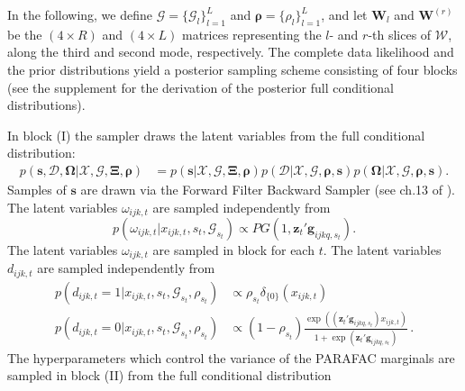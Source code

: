 \documentclass[12pt,a4paper]{article}
\theoremstyle{custom}
\begin{document}
In the following, we define $\mathcal{G} = \lbrace \mathcal{G}_l \rbrace_{l=1}^L$ and $\boldsymbol{\rho} = \lbrace \rho_l \rbrace_{l=1}^L$, and let $\mathbf{W}_l$ and $\mathbf{W}^{(r)}$ be the $(4\times R)$ and $(4\times L)$ matrices representing the $l$- and $r$-th slices of $\mathcal{W}$, along the third and second mode, respectively.
The complete data likelihood and the prior distributions yield a posterior sampling scheme consisting of four blocks (see the supplement for the derivation of the posterior full conditional distributions).

In block (I) the sampler draws the latent variables from the full conditional distribution:
\begin{align}
p(\mathbf{s},\mathcal{D},\boldsymbol{\Omega} | \boldsymbol{\mathcal{X}}, \mathcal{G}, \boldsymbol{\Xi}, \boldsymbol{\rho}) & = p( \mathbf{s} | \boldsymbol{\mathcal{X}}, \mathcal{G}, \boldsymbol{\Xi}, \boldsymbol{\rho}) p( \mathcal{D} | \boldsymbol{\mathcal{X}}, \mathcal{G}, \boldsymbol{\rho}, \mathbf{s}) p( \boldsymbol{\Omega} | \boldsymbol{\mathcal{X}}, \mathcal{G}, \boldsymbol{\rho}, \mathbf{s}).
\end{align}
Samples of $\mathbf{s}$ are drawn via the Forward Filter Backward Sampler (see ch.13 of \cite{Fruhwirth06FiniteMixtures_MarkovSwitch_book}). The latent variables $\omega_{ijk,t}$ are sampled independently from
\begin{equation}
p( \omega_{ijk,t} | x_{ijk,t}, s_t, \mathcal{G}_{s_t}) \propto PG(1, \mathbf{z}_t' \mathbf{g}_{ijkq,s_t}).
\label{eq:posterior_omega}
\end{equation}
The latent variables $\omega_{ijk,t}$ are sampled in block for each $t$. The latent variables $d_{ijk,t}$ are sampled independently from
\begin{equation}
\begin{split}
p( d_{ijk,t}=1 | x_{ijk,t}, s_t, \mathcal{G}_{s_t}, \rho_{s_t}) & \propto \rho_{s_t} \delta_{\lbrace 0 \rbrace}(x_{ijk,t}) \\
p( d_{ijk,t}=0 | x_{ijk,t}, s_t, \mathcal{G}_{s_t}, \rho_{s_t}) & \propto (1-\rho_{s_t}) \frac{\exp( (\mathbf{z}_t' \mathbf{g}_{ijkq,s_t})x_{ijk,t})}{1+\exp( \mathbf{z}_t' \mathbf{g}_{ijkq,s_t} )} \, .
\end{split}
\label{eq:posterior_d}
\end{equation}
The hyperparameters which control the variance of the PARAFAC marginals are sampled in block (II) from the full conditional distribution
\end{document}
